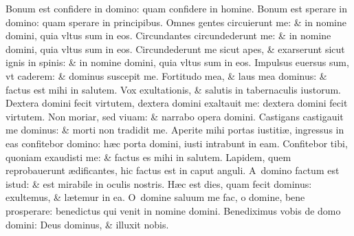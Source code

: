 \documentclass[a5paper,10pt]{book}
\def\ae{æ}
\begin{document}
\begin{multicols*}{2}
\newline \color{red} B\color{black}onum est confidere in domino: quam confidere in homine.
\newline \color{red} B\color{black}onum est sperare in domino: quam sperare in principibus.
\newline \color{red} O\color{black}mnes gentes circuierunt me: \& in nomine domini, quia vltus sum in eos.
\newline \color{red} C\color{black}ircundantes circundederunt me: \& in nomine domini, quia vltus sum in eos.
\newline \color{red} C\color{black}ircundederunt me sicut apes, \& exarserunt sicut ignis in spinis: \& in nomine domini, quia vltus sum in eos.
\newline \color{red} I\color{black}mpulsus euersus sum, vt caderem: \& dominus suscepit me.
\newline \color{red} F\color{black}ortitudo mea, \& laus mea dominus: \& factus est mihi in salutem.
\newline \color{red} V\color{black}ox exultationis, \& salutis in tabernaculis iustorum.
\newline \color{red} D\color{black}extera domini fecit virtutem, dextera domini exaltauit me: dextera domini fecit virtutem.
\newline \color{red} N\color{black}on moriar, sed viuam: \& narrabo opera domini.
\newline \color{red} C\color{black}astigans castigauit me dominus: \& morti non tradidit me.
\newline \color{red} A\color{black}perite mihi portas iustiti\ae , ingressus in eas confitebor domino: h\ae c porta domini, iusti intrabunt in eam.
\newline \color{red} C\color{black}onfitebor tibi, quoniam exaudisti me: \& factus es mihi in salutem.
\newline \color{red} L\color{black}apidem, quem reprobauerunt \ae dificantes, hic factus est in caput anguli.
\newline \color{red} A\color{black}\ domino factum est istud: \& est mirabile in oculis nostris.
\newline \color{red} H\color{black}\ae c est dies, quam fecit dominus: exultemus, \& l\ae temur in ea.
\newline \color{red} O\color{black}\ domine saluum me fac, o domine, bene prosperare: benedictus qui venit in nomine domini.
\newline \color{red} B\color{black}enediximus vobis de domo domini: Deus dominus, \& illuxit nobis.

\end{multicols*}
\end{document}
